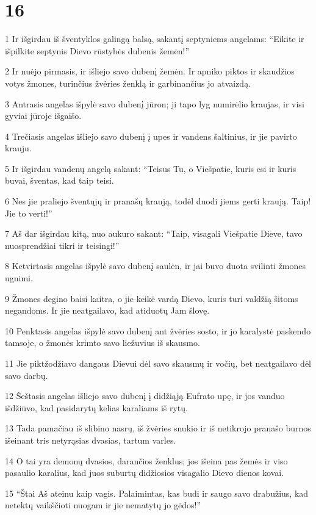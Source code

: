 \chapter{16}


\par 1 Ir išgirdau iš šventyklos galingą balsą, sakantį septyniems angelams: “Eikite ir išpilkite septynis Dievo rūstybės dubenis žemėn!” 
\par 2 Ir nuėjo pirmasis, ir išliejo savo dubenį žemėn. Ir apniko piktos ir skaudžios votys žmones, turinčius žvėries ženklą ir garbinančius jo atvaizdą. 
\par 3 Antrasis angelas išpylė savo dubenį jūron; ji tapo lyg numirėlio kraujas, ir visi gyviai jūroje išgaišo. 
\par 4 Trečiasis angelas išliejo savo dubenį į upes ir vandens šaltinius, ir jie pavirto krauju. 
\par 5 Ir išgirdau vandenų angelą sakant: “Teisus Tu, o Viešpatie, kuris esi ir kuris buvai, šventas, kad taip teisi. 
\par 6 Nes jie praliejo šventųjų ir pranašų kraują, todėl duodi jiems gerti kraują. Taip! Jie to verti!” 
\par 7 Aš dar išgirdau kitą, nuo aukuro sakant: “Taip, visagali Viešpatie Dieve, tavo nuosprendžiai tikri ir teisingi!” 
\par 8 Ketvirtasis angelas išpylė savo dubenį saulėn, ir jai buvo duota svilinti žmones ugnimi. 
\par 9 Žmones degino baisi kaitra, o jie keikė vardą Dievo, kuris turi valdžią šitoms negandoms. Ir jie neatgailavo, kad atiduotų Jam šlovę. 
\par 10 Penktasis angelas išpylė savo dubenį ant žvėries sosto, ir jo karalystė paskendo tamsoje, o žmonės krimto savo liežuvius iš skausmo. 
\par 11 Jie piktžodžiavo dangaus Dievui dėl savo skausmų ir vočių, bet neatgailavo dėl savo darbų. 
\par 12 Šeštasis angelas išliejo savo dubenį į didžiąją Eufrato upę, ir jos vanduo išdžiūvo, kad pasidarytų kelias karaliams iš rytų. 
\par 13 Tada pamačiau iš slibino nasrų, iš žvėries snukio ir iš netikrojo pranašo burnos išeinant tris netyrąsias dvasias, tartum varles. 
\par 14 O tai yra demonų dvasios, darančios ženklus; jos išeina pas žemės ir viso pasaulio karalius, kad juos suburtų didžiosios visagalio Dievo dienos kovai. 
\par 15 “Štai Aš ateinu kaip vagis. Palaimintas, kas budi ir saugo savo drabužius, kad netektų vaikščioti nuogam ir jie nematytų jo gėdos!” 

